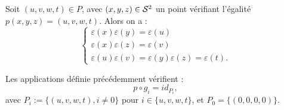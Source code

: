 \documentclass[hidelinks, 10pt]{article}
\begin{document}
\begin{remark}
Soit $(u,v,w,t)\in P$, avec $(x,y,z)\in\mathcal{S}^{2}$ un point vérifiant l'égalité~$p(x,y,z)=(u,v,w,t)$. Alors on a :\begin{equation}\label{eq:projective-signe}
\left\{\begin{matrix}
\varepsilon(x)\varepsilon(y)=\varepsilon(u)\\
\varepsilon(x)\varepsilon(z)=\varepsilon(v)\\
\varepsilon(u)\varepsilon(v)=\varepsilon(y)\varepsilon(z)=\varepsilon(t).
\end{matrix}\right.
\end{equation}
\end{remark}

\begin{lemma}\label{lemma:projective-inverses}
Les applications définie précédemment vérifient : \[p\circ g_i=id_{P_i},\] avec $P_i:=\{(u,v,w,t),i\neq0\}$ pour $i\in\{u,v,w,t\}$, et $P_0=\{(0,0,0,0)\}$.
\end{lemma}
\end{document}
